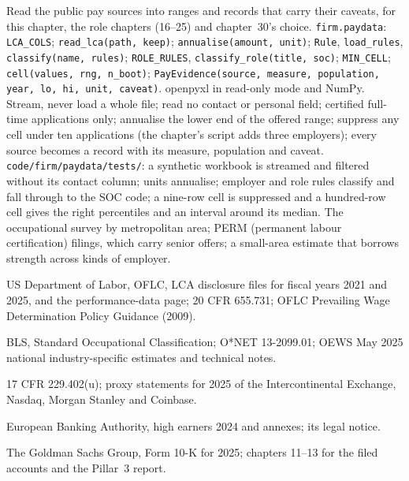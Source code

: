 \begin{build}
 Read the public pay sources into ranges and records that carry their caveats, for this chapter, the role
chapters (16--25) and chapter~30's choice.
 \texttt{firm.paydata}: \texttt{LCA\_COLS}; \texttt{read\_lca(path, keep)}; \texttt{annualise(amount,
unit)}; \texttt{Rule}, \texttt{load\_rules}, \texttt{classify(name, rules)}; \texttt{ROLE\_RULES},
\texttt{classify\_role(title, soc)}; \texttt{MIN\_CELL}; \texttt{cell(values, rng, n\_boot)};
\texttt{PayEvidence(source, measure, population, year, lo, hi, unit, caveat)}. openpyxl in read-only mode and NumPy.
 Stream, never load a whole file; read no contact or personal field; certified full-time applications
only; annualise the lower end of the offered range; suppress any cell under ten applications (the chapter's script adds
three employers); every source becomes a record with its measure, population and caveat.
 \texttt{code/firm/paydata/tests/}: a synthetic workbook is streamed and filtered without its
contact column; units annualise; employer and role rules classify and fall through to the SOC code; a nine-row cell is
suppressed and a hundred-row cell gives the right percentiles and an interval around its median.
 The occupational survey by metropolitan area; PERM (permanent labour certification) filings, which carry
senior offers; a small-area estimate that borrows strength across kinds of employer.
\end{build}

\begin{omsources}
\item US Department of Labor, OFLC, LCA disclosure files for fiscal years 2021 and 2025, and the performance-data page;
20 CFR 655.731; OFLC Prevailing Wage Determination Policy Guidance (2009).
\item BLS, Standard Occupational Classification; O*NET 13-2099.01; OEWS May 2025 national industry-specific estimates
and technical notes.
\item 17 CFR 229.402(u); proxy statements for 2025 of the Intercontinental Exchange, Nasdaq, Morgan Stanley and Coinbase.
\item European Banking Authority, high earners 2024 and annexes; its legal notice.
\item The Goldman Sachs Group, Form 10-K for 2025; chapters 11--13 for the filed accounts and the Pillar~3 report.
\end{omsources}

